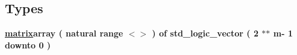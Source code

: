 \subsection*{Types}
 \begin{DoxyCompactItemize}
\item 
\hypertarget{classtb___r_m_decoder_1_1_behavioral_ga016dcfd62eba82b89adb229b316a92ce}{{\bfseries \hyperlink{group___r_m_decoder_ga016dcfd62eba82b89adb229b316a92ce}{matrix}{\bfseries \textcolor{keywordflow}{array}\textcolor{vhdlchar}{ }\textcolor{vhdlchar}{(}\textcolor{vhdlchar}{ }\textcolor{comment}{natural}\textcolor{vhdlchar}{ }\textcolor{keywordflow}{range}\textcolor{vhdlchar}{ }\textcolor{vhdlchar}{$<$$>$}\textcolor{vhdlchar}{ }\textcolor{vhdlchar}{)}\textcolor{vhdlchar}{ }\textcolor{vhdlchar}{ }\textcolor{keywordflow}{of}\textcolor{vhdlchar}{ }\textcolor{comment}{std\+\_\+logic\+\_\+vector}\textcolor{vhdlchar}{ }\textcolor{vhdlchar}{(}\textcolor{vhdlchar}{ }\textcolor{vhdlchar}{ } \textcolor{vhdldigit}{2} \textcolor{vhdlchar}{$\ast$}\textcolor{vhdlchar}{$\ast$}\textcolor{vhdlchar}{ }\textcolor{vhdlchar}{ }\textcolor{vhdlchar}{ }\textcolor{vhdlchar}{m}\textcolor{vhdlchar}{-\/}\textcolor{vhdlchar}{ } \textcolor{vhdldigit}{1} \textcolor{vhdlchar}{ }\textcolor{keywordflow}{downto}\textcolor{vhdlchar}{ }\textcolor{vhdlchar}{ } \textcolor{vhdldigit}{0} \textcolor{vhdlchar}{ }\textcolor{vhdlchar}{)}\textcolor{vhdlchar}{ }}} }\label{classtb___r_m_decoder_1_1_behavioral_ga016dcfd62eba82b89adb229b316a92ce}

\end{DoxyCompactItemize}
